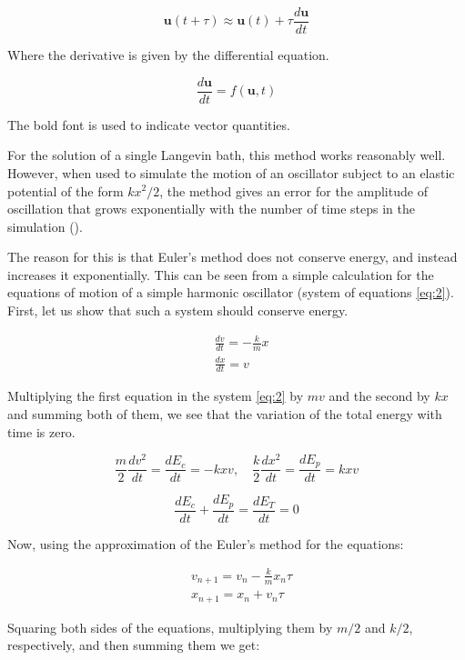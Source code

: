 $$\mathbf{u}(t+\tau) \approx \mathbf{u}(t) + \tau \frac{d\mathbf{u}}{dt}$$

Where the derivative is given by the differential equation.

$$\frac{d\mathbf{u}}{dt} = f(\mathbf{u},t)$$

The bold font is used to indicate vector quantities.

For the solution of a single Langevin bath, this method works reasonably well. However, when used to simulate the motion of an oscillator subject to an elastic potential of the form $k x^2/2$, the method gives an error for the amplitude of oscillation that grows exponentially with the number of time steps in the simulation ().

The reason for this is that Euler's method does not conserve energy, and instead increases it exponentially. This can be seen from a simple calculation for the equations of motion of a simple harmonic oscillator (system of equations \ref{eq:2}). First, let us show that such a system should conserve energy.

\begin{equation*} \label{eq:2}
\begin{aligned}
&\frac{dv}{dt} = -\frac{k}{m}x\\
&\frac{dx}{dt}=v
\end{aligned}
\end{equation*}

Multiplying the first equation in the system \ref{eq:2} by $m v$ and the second by $k x$ and summing both of them, we see that the variation of the total energy with time is zero.

$$\frac{m}{2}\frac{d v^2}{dt} = \frac{d E_c}{dt} = -k x v, \quad
\frac{k}{2}\frac{d x^2}{dt} = \frac{d E_p}{dt} = k x v$$

$$\frac{d E_c}{dt} + \frac{d E_p}{dt} = \frac{d E_T}{dt} = 0$$

Now, using the approximation of the Euler's method for the equations:

\begin{equation*}
\begin{aligned}
&v_{n+1} = v_n -\frac{k}{m}x_n \tau\\
&x_{n+1} = x_n + v_n \tau
\end{aligned}
\end{equation*}

Squaring both sides of the equations, multiplying them by $m/2$ and $k/2$, respectively, and then summing them we get:

